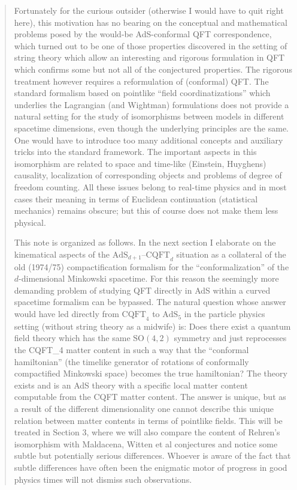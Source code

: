 \documentclass{article}
\begin{document}
\begin{quote}
Fortunately for the curious outsider (otherwise I would have to quit
right here), this motivation has no bearing on the conceptual and
mathematical problems posed by the would-be AdS-conformal QFT
correspondence, which turned out to be one of those properties
discovered in the setting of string theory which allow an interesting
and rigorous formulation in QFT which confirms some but not all of the
conjectured properties. The rigorous treatment however requires a
reformulation of (conformal) QFT. The standard formalism based on
pointlike ``field coordinatizations'' which underlies the Lagrangian
(and Wightman) formulations does not provide a natural setting for the
study of isomorphisms between models in different spacetime dimensions,
even though the underlying principles are the same. One would have to
introduce too many additional concepts and auxiliary tricks into the
standard framework. The important aspects in this isomorphism are
related to space and time-like (Einstein, Huyghens) causality,
localization of corresponding objects and problems of degree of freedom
counting. All these issues belong to real-time physics and in most cases
their meaning in terms of Euclidean continuation (statistical mechanics)
remains obscure; but this of course does not make them less physical.

This note is organized as follows. In the next section I elaborate on
the kinematical aspects of the
\(\mathrm{AdS}_{d+1}\)--\(\mathrm{CQFT}_d\) situation as a collateral of
the old (1974/75) compactification formalism for the
``conformalization'' of the \(d\)-dimensional Minkowski spacetime. For
this reason the seemingly more demanding problem of studying QFT
directly in AdS within a curved spacetime formalism can be bypassed. The
natural question whose answer would have led directly from
\(\mathrm{CQFT}_4\) to \(\mathrm{AdS}_5\) in the particle physics
setting (without string theory as a midwife) is: Does there exist a
quantum field theory which has the same \(\mathrm{SO}(4,2)\) symmetry
and just reprocesses the CQFT\_4 matter content in such a way that the
``conformal hamiltonian'' (the timelike generator of rotations of
conformally compactified Minkowski space) becomes the true hamiltonian?
The theory exists and is an AdS theory with a specific local matter
content computable from the CQFT matter content. The answer is unique,
but as a result of the different dimensionality one cannot describe this
unique relation between matter contents in terms of pointlike fields.
This will be treated in Section 3, where we will also compare the
content of Rehren's isomorphism with Maldacena, Witten et al conjectures
and notice some subtle but potentially serious differences. Whoever is
aware of the fact that subtle differences have often been the enigmatic
motor of progress in good physics times will not dismiss such
observations.


\end{quote}
\end{document}
